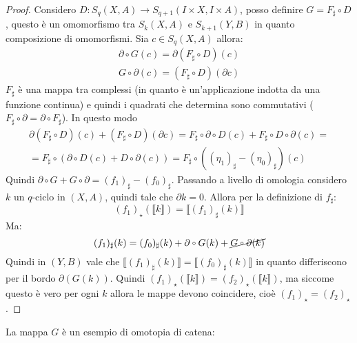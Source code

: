 \begin{proof}
  Considero $ D \colon S_q(X,A) \to S_{q+1}(I \times X, I \times A) $, posso definire
  $ G = F_\sharp \circ D $, questo è un omomorfismo tra $ S_k(X,A) $ e
  $ S_{k+1}(Y,B) $ in quanto composizione di omomorfismi.
  Sia $ c \in S_q(X,A) $ allora:
  \begin{gather*}
    \partial \circ G (c) = \partial (F_\sharp \circ D)(c) \\
    G \circ \partial (c) = (F_\sharp \circ D)(\partial c)
  \end{gather*}
  $ F_\sharp $ è una mappa tra complessi (in quanto è un'applicazione indotta da una
  funzione continua) e quindi i quadrati che determina sono commutativi
  ($ F_\sharp \circ \partial = \partial \circ F_\sharp $). In questo modo
  \begin{gather*}
    \partial (F_\sharp \circ D)(c) + (F_\sharp \circ D)(\partial c) = F_\sharp \circ \partial \circ D (c) + F_\sharp \circ D \circ \partial (c) = \\
    = F_\sharp \circ ( \partial \circ D (c) + D \circ \partial (c)) = F_\sharp \circ ( (\eta_1)_\sharp - (\eta_0)_\sharp) (c)
  \end{gather*}
  Quindi $ \partial \circ G + G \circ \partial = (f_1)_\sharp - (f_0)_\sharp $.
  Passando a livello di omologia considero $ k $ un $ q $-ciclo in $ (X,A) $, quindi
  tale che $ \partial k = 0 $. Allora per la definizione di $ f_\sharp $:
  \[
    (f_1)_\star(\llbracket k \rrbracket) = \llbracket(f_1)_\sharp(k)\rrbracket
  \]
  Ma:
  \[
    (f_1)_\sharp(k) = (f_0)_\sharp (k) + \partial \circ G (k) + \cancel{G \circ \partial (k)}
  \]
  Quindi in $ (Y,B) $ vale che
  $ \llbracket(f_1)_\sharp(k)\rrbracket = \llbracket(f_0)_\sharp(k)\rrbracket $ in quanto differiscono per il bordo
  $ \partial(G(k)) $. Quindi
  $ (f_1)_\star(\llbracket k \rrbracket) = (f_2)_\star(\llbracket k \rrbracket) $, ma siccome questo è vero per ogni
  $ k $ allora le mappe devono coincidere, cioè $ (f_1)_\star = (f_2)_\star $.
\end{proof}
\eproof
La mappa $ G $ è un esempio di omotopia di catena:
